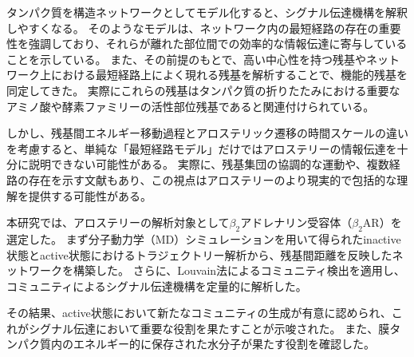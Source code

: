 タンパク質を構造ネットワークとしてモデル化すると、シグナル伝達機構を解釈しやすくなる。
そのようなモデルは、ネットワーク内の最短経路の存在の重要性を強調\cite{Ghosh2007}しており、それらが離れた部位間での効率的な情報伝達に寄与していることを示している。
また、その前提のもとで、高い中心性を持つ残基\cite{amitai2004}やネットワーク上における最短経路上によく現れる残基\cite{delsol2006}を解析することで、機能的残基を同定してきた。
実際にこれらの残基はタンパク質の折りたたみにおける重要なアミノ酸や酵素ファミリーの活性部位残基であると関連付けられている。

しかし、残基間エネルギー移動過程とアロステリック遷移の時間スケールの違いを考慮すると、単純な「最短経路モデル」だけではアロステリーの情報伝達を十分に説明できない可能性がある。
実際に、残基集団の協調的な運動\cite{Kornev2015}や、複数経路の存在\cite{delSol2009}を示す文献もあり、この視点はアロステリーのより現実的で包括的な理解を提供する可能性がある。

本研究では、アロステリーの解析対象として$\beta_2$アドレナリン受容体（$\beta_2$AR）を選定した。
まず分子動力学（MD）シミュレーションを用いて得られたinactive状態とactive状態におけるトラジェクトリー解析から、残基間距離を反映したネットワークを構築した。
さらに、Louvain法\cite{Blondel2008}によるコミュニティ検出を適用し、コミュニティによるシグナル伝達機構を定量的に解析した。

その結果、active状態において新たなコミュニティの生成が有意に認められ、これがシグナル伝達において重要な役割を果たすことが示唆された。
また、膜タンパク質内のエネルギー的に保存された水分子\cite{Angel2009}が果たす役割を確認した。

